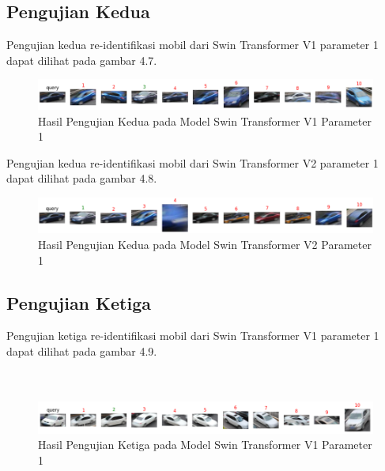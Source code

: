 \subsection{Pengujian Kedua}

Pengujian kedua re-identifikasi mobil dari Swin Transformer V1 parameter 1 dapat dilihat pada gambar 4.7.

\begin{figure}[ht]
  \centering
  \includegraphics[scale=0.6]{gambar/qUE57v1P1IT3.png}
  \caption{Hasil Pengujian Kedua pada Model Swin Transformer V1 Parameter 1}
  \label{fig:hasilpengujiankeduapadamodelswintransformerv1param1}
\end{figure}

Pengujian kedua re-identifikasi mobil dari Swin Transformer V2 parameter 1 dapat dilihat pada gambar 4.8.

\begin{figure}[h!]
  \centering
  \includegraphics[scale=0.6]{gambar/Que57V2P1IT1.png}
  \caption{Hasil Pengujian Kedua pada Model Swin Transformer V2 Parameter 1}
  \label{fig:hasilpengujiankeduapadamodelswintransformerv2param1}
\end{figure}

\subsection{Pengujian Ketiga}

Pengujian ketiga re-identifikasi mobil dari Swin Transformer V1 parameter 1 dapat dilihat pada gambar 4.9. \\
\\
\\

\begin{figure}[ht]
  \centering
  \includegraphics[scale=0.6]{gambar/Que61V1P1IT3.png}
  \caption{Hasil Pengujian Ketiga pada Model Swin Transformer V1 Parameter 1}
  \label{fig:hasilpengujianketigapadamodelswintransformerv1param1}
\end{figure}

